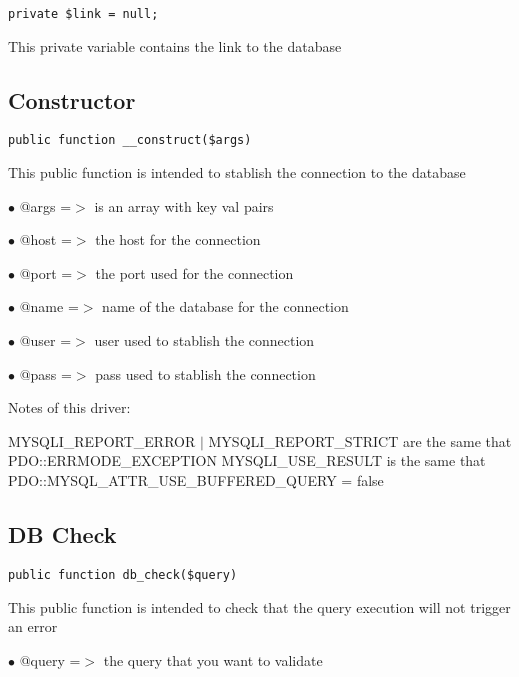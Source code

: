 \documentclass[a4paper]{book}
\begin{document}
\begin{lstlisting}
private $link = null;
\end{lstlisting}

This private variable contains the link to the database

\hypertarget{toc359}{}
\subsection{Constructor}

\begin{lstlisting}
public function __construct($args)
\end{lstlisting}

This public function is intended to stablish the connection to the database

\begin{compactitem}
\item[\color{myblue}$\bullet$] @args =$>$ is an array with key val pairs
\item[\color{myblue}$\bullet$] @host =$>$ the host for the connection
\item[\color{myblue}$\bullet$] @port =$>$ the port used for the connection
\item[\color{myblue}$\bullet$] @name =$>$ name of the database for the connection
\item[\color{myblue}$\bullet$] @user =$>$ user used to stablish the connection
\item[\color{myblue}$\bullet$] @pass =$>$ pass used to stablish the connection
\end{compactitem}

Notes of this driver:

MYSQLI\_REPORT\_ERROR $|$ MYSQLI\_REPORT\_STRICT are the same that PDO::ERRMODE\_EXCEPTION
MYSQLI\_USE\_RESULT is the same that PDO::MYSQL\_ATTR\_USE\_BUFFERED\_QUERY = false

\hypertarget{toc360}{}
\subsection{DB Check}

\begin{lstlisting}
public function db_check($query)
\end{lstlisting}

This public function is intended to check that the query execution will not trigger an error

\begin{compactitem}
\item[\color{myblue}$\bullet$] @query =$>$ the query that you want to validate
\end{compactitem}
\end{document}

